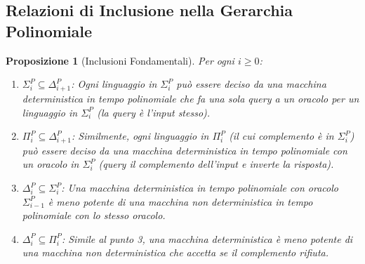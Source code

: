 \documentclass[a4paper, 11pt]{book} %
\newtheorem{proposition}[theorem]{Proposizione}
\theoremstyle{definition}
\begin{document}
\subsection{Relazioni di Inclusione nella Gerarchia Polinomiale}
\begin{proposition}[Inclusioni Fondamentali]
Per ogni $i \ge 0$:
\begin{enumerate}
    \item $\Sigma_i^P \subseteq \Delta_{i+1}^P$: Ogni linguaggio in $\Sigma_i^P$ può essere deciso da una macchina deterministica in tempo polinomiale che fa una sola query a un oracolo per un linguaggio in $\Sigma_i^P$ (la query è l'input stesso).
    \item $\Pi_i^P \subseteq \Delta_{i+1}^P$: Similmente, ogni linguaggio in $\Pi_i^P$ (il cui complemento è in $\Sigma_i^P$) può essere deciso da una macchina deterministica in tempo polinomiale con un oracolo in $\Sigma_i^P$ (query il complemento dell'input e inverte la risposta).
    \item $\Delta_i^P \subseteq \Sigma_i^P$: Una macchina deterministica in tempo polinomiale con oracolo $\Sigma_{i-1}^P$ è meno potente di una macchina non deterministica in tempo polinomiale con lo stesso oracolo.
    \item $\Delta_i^P \subseteq \Pi_i^P$: Simile al punto 3, una macchina deterministica è meno potente di una macchina non deterministica che accetta se il complemento rifiuta.
\end{enumerate}
\end{proposition}
\end{document}
